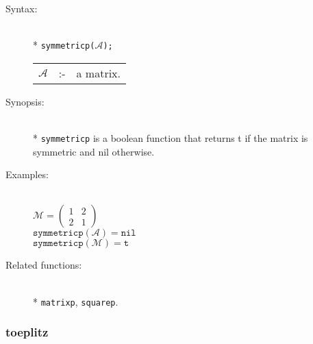 \begin{description}
\item[Syntax:]\mbox{}\\*
\texttt{symmetricp($\mathcal{A}$);}\\[2mm]
\begin{tabular}{l l l}
$\mathcal{A}$ &:-& a matrix.
\end{tabular}

\item[Synopsis:]\mbox{}\\*
\texttt{symmetricp} is a boolean function that returns t if the
                matrix is symmetric and nil otherwise.

\item[Examples:]\mbox{}\\
  \(\mathcal{M} = \begin{pmatrix} 1 & 2 \\ 2 & 1 \end{pmatrix}\) \\[2mm]
  \(\texttt{symmetricp}(\mathcal{A}) = \texttt{nil}\) \\[2mm]
  \(\texttt{symmetricp}(\mathcal{M}) = \texttt{t}\)

\item[Related functions:]\mbox{}\\*
\texttt{matrixp}, \texttt{squarep}.
\end{description}


\subsubsection{toeplitz}
\label{linalg:toeplitz}

